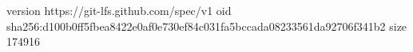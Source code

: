 version https://git-lfs.github.com/spec/v1
oid sha256:d100b0ff5fbea8422e0af0e730ef84c031fa5bccada08233561da92706f341b2
size 174916
